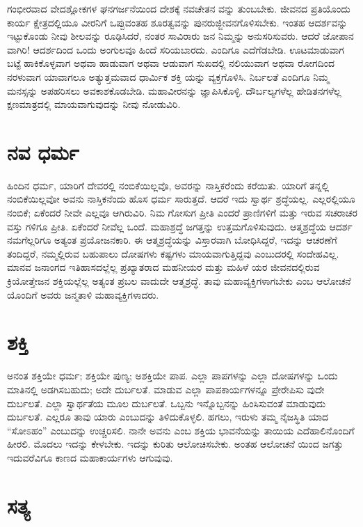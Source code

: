 ಗಂಭೀರವಾದ ವೇದಶ್ಲೋಕಗಳ ಘನಗರ್ಜನೆಯಿಂದ ದೇಶಕ್ಕೆ ನವಚೇತನ ವನ್ನು ತುಂಬಬೇಕು. ಜೀವನದ ಪ್ರತಿಯೊಂದು ಕಾರ್ಯ ಕ್ಷೇತ್ರದಲ್ಲಿಯೂ ವೀರನಿಗೆ ಒಪ್ಪುವಂತಹ ಶೂರತ್ವವನ್ನು ಪುನರುಜ್ಜೀವನಗೊಳಿಸಬೇಕು. ಇಂತಹ ಆದರ್ಶವನ್ನು ಇಟ್ಟುಕೊಂಡು ನೀವು ಶೀಲವನ್ನು ರೂಢಿಸಿದರೆ, ನಂತರ ಸಾವಿರಾರು ಜನ ನಿಮ್ಮನ್ನು ಅನುಸರಿಸುವರು. ಆದರೆ ಜೋಪಾನ ವಾಗಿರಿ! ಆದರ್ಶದಿಂದ ಒಂದು ಅಂಗುಲವೂ ಹಿಂದೆ ಸರಿಯಬಾರದು. ಎಂದಿಗೂ ಎದೆಗೆಡಬೇಡಿ. ಊಟಮಾಡುವಾಗ ಬಟ್ಟೆ ಹಾಕಿಕೊಳ್ಳವಾಗ ಅಥವಾ ಹಾಡುವಾಗ ಅಥವಾ ಆಡುವಾಗ ಸುಖದಲ್ಲಿ ನಲಿಯುವಾಗ ಅಥವಾ ರೋಗದಿಂದ ನರಳುವಾಗ ಯಾವಾಗಲೂ ಅತ್ಯುತ್ತಮವಾದ ಧಾರ್ಮಿಕ ಶಕ್ತಿ ಯನ್ನು ವ್ಯಕ್ತಗೊಳಿಸಿ. ನಿರ್ಬಲತೆ ಎಂದಿಗೂ ನಿಮ್ಮ ಮನಸ್ಸನ್ನು ಅಪಹರಿಸಲು ಅವಕಾಶಕೊಡಬೇಡಿ. ಮಹಾವೀರನನ್ನು ಜ್ಞಾಪಿಸಿಕೊಳ್ಳಿ. ದೌರ್ಬಲ್ಯಗಳೆಲ್ಲ ಹೇಡಿತನಗಳೆಲ್ಲ ಕ್ಷಣಮಾತ್ರದಲ್ಲಿ ಮಾಯವಾಗುವುದನ್ನು ನೀವು ನೋಡುವಿರಿ.


\section{ನವ ಧರ್ಮ}

ಹಿಂದಿನ ಧರ್ಮ, ಯಾರಿಗೆ ದೇವರಲ್ಲಿ ನಂಬಿಕೆಯಿಲ್ಲವೊ, ಅವರನ್ನು ನಾಸ್ತಿಕರೆಂದು ಕರೆಯಿತು. ಯಾರಿಗೆ ತನ್ನಲ್ಲಿ ನಂಬಿಕೆಯಿಲ್ಲವೋ ಅವನು ನಾಸ್ತಿಕನೆಂದು ಹೊಸ ಧರ್ಮ ಸಾರುತ್ತದೆ. ಆದರೆ ಇದು ಸ್ವಾರ್ಥ ಶ್ರದ್ಧೆಯಲ್ಲ. ಎಲ್ಲರಲ್ಲಿಯೂ ನಂಬಿಕೆ; ಏಕೆಂದರೆ ನೀವೇ ಎಲ್ಲವೂ ಆಗಿರುವಿರಿ. ನಿಮ ಗೋಸುಗ ಪ್ರೀತಿ ಎಂದರೆ ಪ್ರಾಣಿಗಳಿಗೆ ಮತ್ತು ಇರುವ ಸಚರಾಚರ ವಸ್ತು ಗಳಿಗೂ ಪ್ರೀತಿ. ಏಕೆಂದರೆ ನೀವೆಲ್ಲ ಒಂದೆ. ಮಹಾಶ್ರದ್ಧೆ ಜಗತ್ತನ್ನು ಉತ್ತಮಗೊಳಿಸುವುದು. ಆತ್ಮಶ್ರದ್ಧೆಯ ಆದರ್ಶ ನಮಗೆಲ್ಲರಿಗೂ ಅತ್ಯಂತ ಪ್ರಯೋಜನಕಾರಿ. ಈ ಆತ್ಮಶ್ರದ್ಧೆಯನ್ನು ವಿಸ್ತಾರವಾಗಿ ಬೋಧಿಸಿದ್ದರೆ, ಇದನ್ನು ಆಚರಣೆಗೆ ತಂದಿದ್ದರೆ, ನಮ್ಮಲ್ಲಿರುವ ಬಹುಪಾಲು ದೋಷಗಳು ಕಷ್ಟಗಳು ಮಾಯವಾಗುತ್ತಿದ್ದವು ಎಂಬುದರಲ್ಲಿ ಸಂದೇಹವಿಲ್ಲ. ಮಾನವ ಜನಾಂಗದ ಇತಿಹಾಸದಲ್ಲೆಲ್ಲ ಪ್ರಖ್ಯಾತರಾದ ಮಹನೀಯರ ಮತ್ತು ಮಹಿಳೆ ಯರ ಜೀವನದಲ್ಲಿರುವ ಕ್ರಿಯೋತ್ತೇಜನ ಶಕ್ತಿಯಲ್ಲೆಲ್ಲ ಅತ್ಯಂತ ಪ್ರಬಲ ವಾದುದೇ ಆತ್ಮಶ್ರದ್ಧೆ. ತಾವು ಮಹಾವ್ಯಕ್ತಿಗಳಾಗಬೇಕು ಎಂಬ ಆಲೋಚನೆ ಯೊಂದಿಗೆ ಅವರು ಜನ್ಮತಾಳಿ ಮಹಾವ್ಯಕ್ತಿಗಳಾದರು.


\section{ಶಕ್ತಿ}

ಅನಂತ ಶಕ್ತಿಯೇ ಧರ್ಮ; ಶಕ್ತಿಯೇ ಪುಣ್ಯ; ಅಶಕ್ತಿಯೇ ಪಾಪ. ಎಲ್ಲಾ ಪಾಪಗಳನ್ನು ಎಲ್ಲಾ ದೋಷಗಳನ್ನು ಒಂದು ಮಾತಿನಲ್ಲಿ ಅಡಗಿಸಬಹುದು; ಅದೇ ದುರ್ಬಲತೆ. ಮಾಡುವ ಎಲ್ಲಾ ಪಾಪಕಾರ್ಯಗಳನ್ನೂ ಪ್ರೇರೇಪಿಸು ವುದೇ ದುರ್ಬಲತೆ. ಎಲ್ಲಾ ಸ್ವಾರ್ಥತೆಯ ಮೂಲ ದುರ್ಬಲತೆ. ಒಬ್ಬನು ಇನ್ನೊಬ್ಬನನ್ನು ಹಿಂಸಿಸುವಂತೆ ಮಾಡುವುದು ದುರ್ಬಲತೆ. ಎಲ್ಲರೂ ತಾವು ಯಾರು ಎಂಬುದನ್ನು ತಿಳಿದುಕೊಳ್ಳಲಿ. ಹಗಲು, ಇರುಳು ತಮ್ಮ ನೈಜಸ್ಥಿತಿ ಯಾದ “ಸೋಽಹಂ” ಎಂಬುದನ್ನು ಉಚ್ಚರಿಸಲಿ. ನಾನೇ ಅವನು ಎಂಬ ಶಕ್ತಿಯ ಭಾವನೆಯನ್ನು ತಾಯಿಯ ಎದೆಹಾಲಿನೊಂದಿಗೆ ಹೀರಲಿ. ಮೊದಲು ಇದನ್ನು ಕೇಳಬೇಕು. ಇದನ್ನು ಕುರಿತು ಆಲೋಚಿಸಬೇಕು. ಅಂತಹ ಆಲೋಚನೆ ಯಿಂದ ಜಗತ್ತು ಇದುವರೆವಿಗೂ ಕಾಣದ ಮಹಾಕಾರ್ಯಗಳು ಆಗುವುವು.


\section{ಸತ್ಯ}

